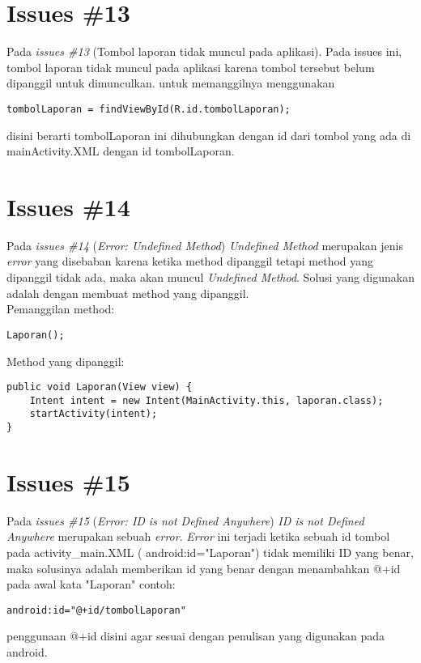 \section{Issues \#13}
Pada \textit{issues \#13} (Tombol laporan tidak muncul pada aplikasi). Pada issues ini, tombol laporan tidak muncul pada aplikasi karena tombol tersebut belum dipanggil untuk dimunculkan. untuk memanggilnya menggunakan \begin{verbatim}
tombolLaporan = findViewById(R.id.tombolLaporan);
\end{verbatim}
disini berarti tombolLaporan ini dihubungkan dengan id dari tombol yang ada di mainActivity.XML dengan id tombolLaporan.

\section{Issues \#14}
Pada \textit{issues \#14} (\textit{Error: Undefined Method}) \textit{Undefined Method} merupakan jenis \textit{error} yang disebaban karena ketika method dipanggil tetapi method yang dipanggil tidak ada, maka akan muncul \textit{Undefined Method}. Solusi yang digunakan adalah dengan membuat method yang dipanggil.\\
Pemanggilan method:
\begin{verbatim}
Laporan();
\end{verbatim}
Method yang dipanggil:
\begin{verbatim}
public void Laporan(View view) {
    Intent intent = new Intent(MainActivity.this, laporan.class);
    startActivity(intent);
}
\end{verbatim}


\section{Issues \#15}
Pada \textit{issues \#15} (\textit{Error: ID is not Defined Anywhere}) \textit{ID is not Defined Anywhere} merupakan sebuah \textit{error}. \textit{Error} ini terjadi ketika sebuah id tombol pada activity\_main.XML ( android:id="Laporan") tidak memiliki ID yang benar, maka solusinya adalah memberikan id yang benar dengan menambahkan @+id pada awal kata "Laporan" contoh:
\begin{verbatim}
android:id="@+id/tombolLaporan"
\end{verbatim}
penggunaan @+id disini agar sesuai dengan penulisan yang digunakan pada android. 

